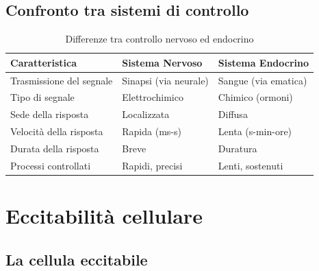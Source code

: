 \documentclass[11pt,a4paper,italian,twoside]{report}
\theoremstyle{definition} %
\begin{document}
\section{Confronto tra sistemi di controllo}
\label{sec:confronto_controlli}

\begin{table}[htbp]
  \centering
  \caption{Differenze tra controllo nervoso ed endocrino}
  \label{tab:nervoso_vs_endocrino}
  \begin{tabularx}{\textwidth}{l X X}
    \toprule
    \textbf{Caratteristica} & \textbf{Sistema Nervoso} & \textbf{Sistema Endocrino} \\
    \midrule
    Trasmissione del segnale & Sinapsi (via neurale) & Sangue (via ematica) \\
    Tipo di segnale & Elettrochimico & Chimico (ormoni) \\
    Sede della risposta & Localizzata & Diffusa \\
    Velocità della risposta & Rapida (ms-s) & Lenta (s-min-ore) \\
    Durata della risposta & Breve & Duratura \\
    Processi controllati & Rapidi, precisi & Lenti, sostenuti \\
    \bottomrule
  \end{tabularx}
\end{table}


\chapter{Eccitabilità cellulare}
\label{chap:eccitabilita}

\section{La cellula eccitabile}
\label{sec:cellula_eccitabile}
\end{document}
